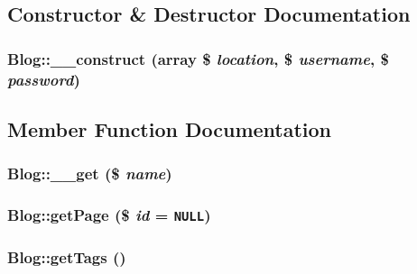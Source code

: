 \subsection{Constructor \& Destructor Documentation}
\hypertarget{classBlog_40f2b1a8e155ea8ae021e5606484cab1}{
\subsubsection[{\_\-\_\-construct}]{\setlength{\rightskip}{0pt plus 5cm}Blog::\_\-\_\-construct (array \$ {\em location}, \/  \$ {\em username}, \/  \$ {\em password})}}
\label{classBlog_40f2b1a8e155ea8ae021e5606484cab1}




\subsection{Member Function Documentation}
\hypertarget{classBlog_0fbd3b0292d70e0975a29a0402701b98}{
\subsubsection[{\_\-\_\-get}]{\setlength{\rightskip}{0pt plus 5cm}Blog::\_\-\_\-get (\$ {\em name})}}
\label{classBlog_0fbd3b0292d70e0975a29a0402701b98}


\hypertarget{classBlog_cbf942c6cbeb2e2f6f55f30a30391a0e}{
\subsubsection[{getPage}]{\setlength{\rightskip}{0pt plus 5cm}Blog::getPage (\$ {\em id} = {\tt NULL})}}
\label{classBlog_cbf942c6cbeb2e2f6f55f30a30391a0e}


\hypertarget{classBlog_92516498af4c4b17491d390725df038b}{
\subsubsection[{getTags}]{\setlength{\rightskip}{0pt plus 5cm}Blog::getTags ()}}
\label{classBlog_92516498af4c4b17491d390725df038b}


